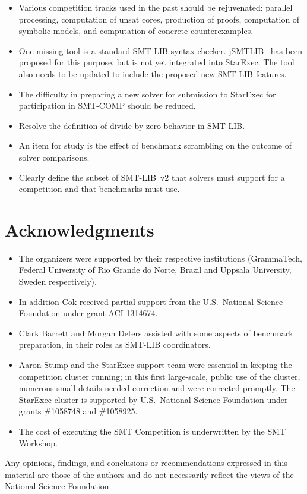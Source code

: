 \documentclass[twoside,11pt]{article}
\begin{document}
\begin{itemize}
\item Various competition tracks used in the past should be rejuvenated: parallel processing, computation of unsat cores, production of proofs, computation of symbolic models, and computation of concrete counterexamples.
\item One missing tool is a standard SMT-LIB syntax checker. jSMTLIB~\cite{cok2011jsmtlib} has been proposed for this purpose, but is not yet integrated into StarExec. The tool also needs to be updated to include the proposed new SMT-LIB features.
\item The difficulty in preparing a new solver for submission to StarExec for participation in SMT-COMP should be reduced.
\item Resolve the definition of divide-by-zero behavior in SMT-LIB.
\item An item for study is the effect of benchmark scrambling on the outcome of solver comparisons.
\item Clearly define the subset of SMT-LIB~v2 that solvers must support for a competition and that benchmarks must use.
\end{itemize}

\section*{Acknowledgments}

\begin{itemize}
\item The organizers were supported by their respective institutions (GrammaTech, Federal University of Rio Grande do Norte, Brazil and Uppsala University, Sweden respectively). 

\item In addition Cok received partial support from the U.S.\ National Science Foundation
under grant ACI-1314674.

\item Clark Barrett and Morgan Deters assisted with some aspects of benchmark preparation,
in their roles as SMT-LIB coordinators.

\item Aaron Stump and the StarExec support team were essential in keeping the competition cluster running;
in this first large-scale, public use of the cluster, numerous small details needed correction and were corrected promptly.
%
The StarExec cluster is supported by 
U.S.\ National Science Foundation under grants \#1058748 and \#1058925.
%
\item The cost of executing the SMT Competition is underwritten by the SMT Workshop. 
\end{itemize}

Any opinions,
findings, and conclusions or recommendations expressed in this
material are those of the authors and do not necessarily reflect the
views of the National Science Foundation.



\end{document}
